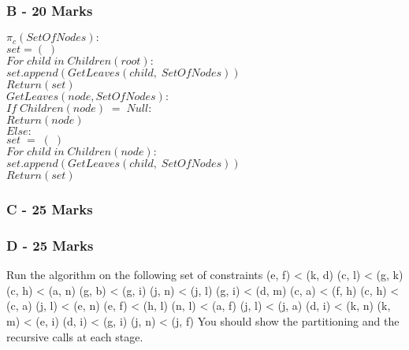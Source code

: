\documentclass[paper=a4, fontsize=11pt]{scrartcl}
\newcommand\tab[1][1cm]{\hspace*{#1}}
\newcommand\dent[1][0.5cm]{\hspace*{#1}}
\numberwithin{equation}{section}		%
\numberwithin{figure}{section}			%
\numberwithin{table}{section}				%
\begin{document}
\subsubsection*{B - 20 Marks}

\iffalse
Expand the partition step (given below) in pseudocode
compute πC = S1, S2, . . . Sr;
\fi


\dent$\pi_c(SetOfNodes):$\\
\tab$set = (\;)$\\
\tab$For\;child\;in\;Children(root):$\\
\tab\tab$set.append(GetLeaves(child,\;SetOfNodes))$\\
\tab$Return(set)$ \\

$GetLeaves(node,SetOfNodes):$\\
\tab$If\;Children(node)\;=\;Null:$\\
\tab\tab$Return(node)$\\
\tab$Else:$\\
\tab\tab$set\;=\;(\;)$\\
\tab\tab$For\;child\;in\;Children(node):$\\
\tab\tab\tab$set.append(GetLeaves(child,\;SetOfNodes))$\\
\tab\tab$Return(set)$

\subsubsection*{C - 25 Marks}

\iffalse
Write a recurrence that expresses the running time of Build depending on the
number of different leaf-labels n and the number of constraints m. Use it to
estimate the running time of the algorithm assuming that the partitioning step
runs in time f (n, m) for some function monotonically nondecreasing function f.
\fi



\subsubsection*{D - 25 Marks}

\iffalse
Run the algorithm on the following set of constraints
(e, f) < (k, d) (c, l) < (g, k) (c, h) < (a, n) (g, b) < (g, i) (j, n) < (j, l) (g, i) < (d, m) (c, a) < (f, h) (c, h) < (c, a) (j, l) < (e, n) (e, f) < (h, l) (n, l) < (a, f) (j, l) < (j, a) (d, i) < (k, n) (k, m) < (e, i) (d, i) < (g, i) (j, n) < (j, f)
You should show the partitioning and the recursive calls at each stage.
\end{document}
